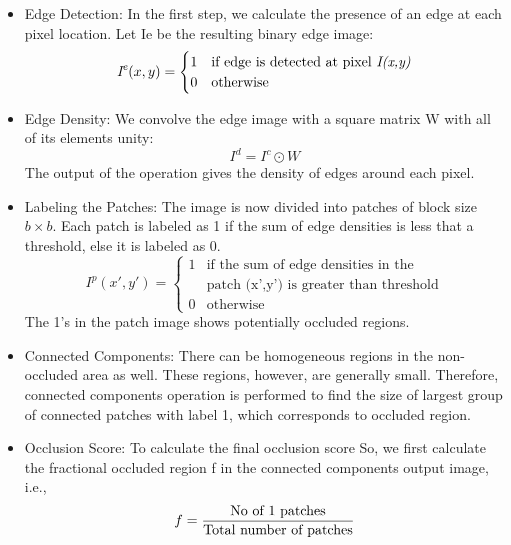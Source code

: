 \documentclass{new}
\begin{document}
\begin{itemize}

\item Edge Detection: In the first step, we calculate the presence of
an edge at each pixel location. Let Ie be the resulting binary
edge image:
\begin{equation}
{\textit{I}^{\textit{e}}(x,y)} =
	\begin{cases}
		1 & \text{if edge is detected at pixel \textit{I(x,y)}}\\
		0 & \text{otherwise}
	\end{cases}
\end{equation}

\item Edge Density: We convolve the edge image with a square
matrix W with all of its elements unity:
\begin{equation}
{\textit{I}^{\textit{d}}} = {\textit{I}^{\textit{c}}} \odot {\textit{W}}
\end{equation}
The output of the operation gives the density of edges around
each pixel.


\item Labeling the Patches: The image is now divided into patches
of block size $b \times b$. Each patch is labeled as 1 if the sum of
edge densities is less that a threshold, else it is labeled as 0.
\begin{equation}
{\textit{I}^{\textit{p}}(x',y')} =
	\begin{cases}
		1 & \text{if the sum of edge densities in the}\\
		  & \text{patch (x',y') is greater than threshold}\\
		
		0 & \text{otherwise}
	\end{cases}
\end{equation}
The 1's in the patch image shows potentially occluded regions.

\item Connected Components: There can be homogeneous regions
in the non-occluded area as well. These regions, however, are
generally small. Therefore, connected components operation
is performed to find the size of largest group of connected
patches with label 1, which corresponds to occluded region.

\item Occlusion Score: To calculate the final occlusion score So,
we first calculate the fractional occluded region f in the connected components output image, i.e.,
\begin{equation}
f = \frac{\text{No of 1 patches}}{\text{Total number of patches}}\\
\end{equation}
\end{itemize}
\end{document}

